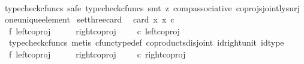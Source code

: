 \begin{isabellebody}
%
\isadelimproof
\ \ %
\endisadelimproof
%
\isatagproof
{}\isamarkupfalse%
{\isacharparenleft}{\kern0pt}typecheck{\isacharunderscore}{\kern0pt}cfuncs{\isacharcomma}{\kern0pt}\ safe{\isacharcomma}{\kern0pt}\ typecheck{\isacharunderscore}{\kern0pt}cfuncs{\isacharcomma}{\kern0pt}\ smt\ {\isacharparenleft}{\kern0pt}z{}{\isacharparenright}{\kern0pt}\ comp{\isacharunderscore}{\kern0pt}associative{}\ coprojs{\isacharunderscore}{\kern0pt}jointly{\isacharunderscore}{\kern0pt}surj\ one{\isacharunderscore}{\kern0pt}unique{\isacharunderscore}{\kern0pt}element{\isacharparenright}{\kern0pt}%
\endisatagproof
{\isafoldproof}%
%
\isadelimproof
\isanewline
%
\endisadelimproof
\isanewline
{}\isamarkupfalse%
\ set{\isacharunderscore}{\kern0pt}three{\isacharunderscore}{\kern0pt}card{\isacharcolon}{\kern0pt}\ \isanewline
\ {\isachardoublequoteopen}card\ {\isacharbraceleft}{\kern0pt}x{\isachardot}{\kern0pt}\ x\ {\isasymin}\isactrlsub c\ {\isacharparenleft}{\kern0pt}{\isasymone}{\isasymCoprod}{\isacharparenleft}{\kern0pt}{\isasymone}{\isasymCoprod}{\isasymone}{\isacharparenright}{\kern0pt}{\isacharparenright}{\kern0pt}{\isacharbraceright}{\kern0pt}\ {\isacharequal}{\kern0pt}\ {}{\isachardoublequoteclose}\isanewline
%
\isadelimproof
%
\endisadelimproof
%
\isatagproof
{}\isamarkupfalse%
\ {\isacharminus}{\kern0pt}\ \isanewline
\ \ \isamarkupfalse%
\ f{}{\isacharcolon}{\kern0pt}\ {\isachardoublequoteopen}left{\isacharunderscore}{\kern0pt}coproj\ {\isasymone}\ {\isacharparenleft}{\kern0pt}{\isasymone}\ {\isasymCoprod}\ {\isasymone}{\isacharparenright}{\kern0pt}\ {\isasymnoteq}\ right{\isacharunderscore}{\kern0pt}coproj\ {\isasymone}\ {\isacharparenleft}{\kern0pt}{\isasymone}\ {\isasymCoprod}\ {\isasymone}{\isacharparenright}{\kern0pt}\ {\isasymcirc}\isactrlsub c\ left{\isacharunderscore}{\kern0pt}coproj\ {\isasymone}\ {\isasymone}{\isachardoublequoteclose}\isanewline
\ \ \ \ \isamarkupfalse%
\ {\isacharparenleft}{\kern0pt}typecheck{\isacharunderscore}{\kern0pt}cfuncs{\isacharcomma}{\kern0pt}\ metis\ cfunc{\isacharunderscore}{\kern0pt}type{\isacharunderscore}{\kern0pt}def\ coproducts{\isacharunderscore}{\kern0pt}disjoint\ id{\isacharunderscore}{\kern0pt}right{\isacharunderscore}{\kern0pt}unit\ id{\isacharunderscore}{\kern0pt}type{\isacharparenright}{\kern0pt}\isanewline
\ \ \isamarkupfalse%
\ f{}{\isacharcolon}{\kern0pt}\ {\isachardoublequoteopen}left{\isacharunderscore}{\kern0pt}coproj\ {\isasymone}\ {\isacharparenleft}{\kern0pt}{\isasymone}\ {\isasymCoprod}\ {\isasymone}{\isacharparenright}{\kern0pt}\ {\isasymnoteq}\ right{\isacharunderscore}{\kern0pt}coproj\ {\isasymone}\ {\isacharparenleft}{\kern0pt}{\isasymone}\ {\isasymCoprod}\ {\isasymone}{\isacharparenright}{\kern0pt}\ {\isasymcirc}\isactrlsub c\ right{\isacharunderscore}{\kern0pt}coproj\ {\isasymone}\ {\isasymone}{\isachardoublequoteclose}\isanewline

\end{isabellebody}
